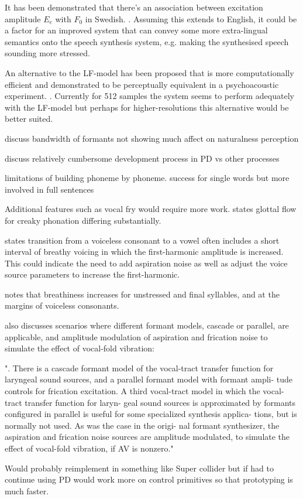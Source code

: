 It has been demonstrated that there's an association between excitation amplitude $E_e$ with $F_0$ in Swedish. \cite{Fant1994}. Assuming this extends to English, it could be a factor for an improved system that can convey some more extra-lingual semantics onto the speech synthesis system, e.g. making the synthesised speech sounding more stressed.

An alternative to the LF-model has been proposed that is more computationally efficient and demonstrated to be perceptually equivalent in a psychoacoustic experiment. \cite{Veldhuis1998}. Currently for 512 samples the system seems to perform adequately with the LF-model but perhaps for higher-resolutions this alternative would be better suited.

discuss bandwidth of formants not showing much affect on naturalness perception

discuss relatively cumbersome development process in PD vs other processes

limitations of building phoneme by phoneme. success for single words but more involved in full sentences

Additional features such as vocal fry would require more work. \cite{Gobl1988} states glottal flow for creaky phonation differing substantially.

\cite{Klatt1990} states transition from a voiceless consonant to a vowel often includes a short interval of breathy voicing in which the first-harmonic amplitude is increased. This could indicate the need to add aspiration noise as well as adjust the voice source parameters to increase the first-harmonic.

\cite{Klatt1990} notes that breathiness increases for unstressed  and final syllables, and at the margins of voiceless consonants.

\cite{Klatt1990} also discusses scenarios where different formant models, cascade or parallel, are applicable, and amplitude modulation of aspiration and frication noise to simulate the effect of vocal-fold vibration:

".
There is a cascade formant model
of the vocal-tract transfer function for laryngeal sound sources,
and a parallel formant model with formant ampli-
tude controls for frication excitation.
A third vocal-tract
model in which the vocal-tract transfer function for laryn- geal sound sources
is approximated by formants
configured
in parallel is useful for some specialized
synthesis
applica-
tions, but is normally not used.
As was the case in the origi-
nal formant synthesizer,
the aspiration and frication noise
sources are amplitude modulated, to simulate the effect of vocal-fold vibration, if AV is nonzero."

Would probably reimplement in something like Super collider but if had to continue using PD would work more on control primitives so that prototyping is much faster.
